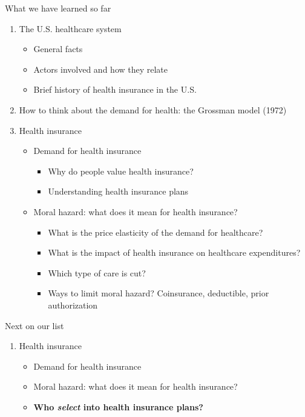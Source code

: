 \begin{frame}{What we have learned so far}

    \begin{enumerate}
        \item The U.S. healthcare system
        \begin{itemize}
            \item General facts
            \item Actors involved and how they relate
            \item Brief history of health insurance in the U.S.
        \end{itemize}
        \item How to think about the demand for health: the Grossman model (1972)
        \item Health insurance
        \begin{itemize}
            \item Demand for health insurance
            \begin{itemize}
                \item Why do people value health insurance?
                \item Understanding health insurance plans
            \end{itemize}
            \item Moral hazard: what does it mean for health insurance?
            \begin{itemize}
                \item What is the price elasticity of the demand for healthcare?
                \item What is the impact of health insurance on healthcare expenditures?
                \item Which type of care is cut?
                \item Ways to limit moral hazard? Coinsurance, deductible, prior authorization
            \end{itemize}
        \end{itemize}
    \end{enumerate}
    
\end{frame}
\begin{frame}{Next on our list}

    \begin{enumerate}
        \item[3.] Health insurance
        \begin{itemize}
            \item Demand for health insurance
            \item Moral hazard: what does it mean for health insurance?
            \item \textbf{Who \textit{select} into health insurance plans?} 
        \end{itemize}
    \end{enumerate}
    
\end{frame}
